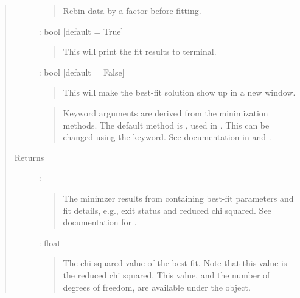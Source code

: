 \documentclass[letterpaper,10pt,english]{sphinxmanual}
\begin{document}
\begin{fulllineitems}
\begin{fulllineitems}
\begin{quote}
\begin{description}
\begin{quote}
Rebin data by a factor  before fitting.
\end{quote}

 : bool   {[}default = True{]}
\begin{quote}

This will print the fit results to terminal.
\end{quote}

 : bool   {[}default = False{]}
\begin{quote}

This will make the best-fit solution show up in a new window.
\end{quote}

\begin{quote}

Keyword arguments are derived from the  minimization methods.
The default method is , used in .
This can be changed using the  keyword.
See documentation in  and .
\end{quote}

\item[{Returns}] \leavevmode
{} : 
\begin{quote}

The minimzer results from  containing best-fit parameters
and fit details, e.g., exit status and reduced chi squared.
See documentation for .
\end{quote}

 : float
\begin{quote}

The chi squared value of the best-fit. Note that this value is 
the reduced chi squared. This value, and the number of degrees of freedom,
are available under the  object.
\end{quote}


\end{description}
\end{quote}
\end{fulllineitems}
\end{fulllineitems}
\end{document}
